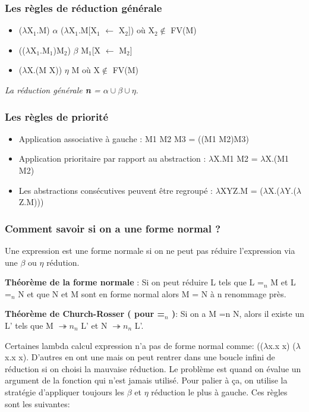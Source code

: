 \documentclass[10pt,a4paper]{article}
\begin{document}
			\subsubsection{Les règles de réduction générale}
			\begin{itemize}
				\item ($\lambda$X$_{1}$.M) $\alpha$ ($\lambda$X$_{1}$.M[X$_{1}$ $\leftarrow$ X$_{2}$])
				où X$_{2}$$\notin$  FV(M)
				\item (($\lambda$X$_{1}$.M$_{1}$)M$_{2}$) $\beta$ M$_{1}$[X $\leftarrow$ M$_{2}$]
				\item ($\lambda$X.(M X)) $\eta$ M 
				où X$\notin$  FV(M)
			\end{itemize}
			
			\textit{La réduction générale \textbf{n} = $\alpha \cup \beta \cup \eta$}.
			
			\subsubsection{Les règles de priorité}
			\begin{itemize}
				\item Application associative à gauche : M1 M2 M3 = ((M1 M2)M3)
				\item Application prioritaire par rapport au abstraction : $\lambda$X.M1 M2 =  $\lambda$X.(M1 M2)
				\item Les abstractions consécutives peuvent être regroupé : $\lambda$XYZ.M = ($\lambda$X.($\lambda$Y.($\lambda$Z.M)))
			\end{itemize}
			
		
			\subsubsection{Comment savoir si on a une forme normal ?}
			
			Une expression est une forme normale si on ne peut pas r\'{e}duire l'expression via une $\beta$ ou $\eta$ r\'{e}dution.
			\medbreak
			
			\textbf{Th\'{e}or\`{e}me de la forme normale} :
			Si on peut r\'{e}duire L tels que L =$_{n}$ M et L =$_{n}$ N et que N et M sont en forme normal alors M = N à n renommage pr\`{e}s.
			\medbreak	
			
			\textbf{Th\'{e}or\`{e}me de Church-Rosser ( pour =$_{n}$ )}:
			Si on a M =n N, alors il existe un L' tels que M $\twoheadrightarrow n_{n}$ L' et N $\twoheadrightarrow n_{n}$ L'.
			\medbreak
			
			Certaines lambda calcul expression n'a pas de forme normal comme: (($\lambda$x.x x) ($\lambda$x.x x). 
			\newline
			D'autres en ont une mais on peut rentrer dans une boucle infini de r\'{e}duction si on choisi la mauvaise r\'{e}duction.
			\medbreak
			Le probl\`{e}me est quand on \'{e}value un argument de la fonction qui n'est jamais utilis\'{e}. Pour palier \`{a} ça, on utilise la strat\'{e}gie d'appliquer toujours les $\beta$ et $\eta$ réduction le plus \`{a} gauche. Ces règles sont les suivantes:
			\medbreak
			
\end{document}
